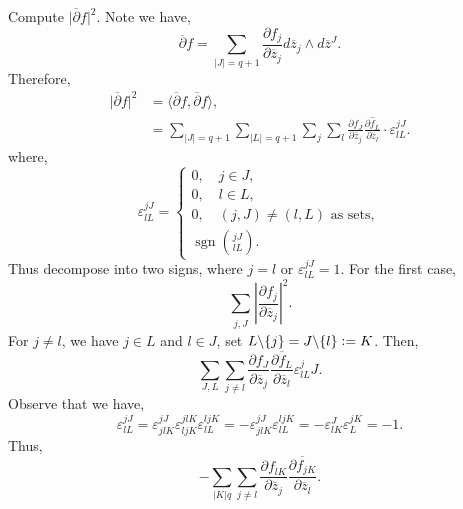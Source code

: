 \documentclass{article}
\DeclareMathOperator{\sgn}{sgn}
\newcommand{\defeq}{\vcentcolon=}
\newcommand{\pd}[2]{{\frac {\partial#1} {\partial#2}}}
\begin{document}
Compute $\vert \overline{\partial}f\vert^2$. Note we have,
\begin{equation*}
  \overline{\partial}f=\sum_{\vert J\vert = q+1}\pd{f_j}{\overline{z}_j}d\overline{z}_j\wedge d\overline{z}^J.
\end{equation*}
Therefore,
\begin{align*}
  \vert\overline{\partial}f\vert^2 & = \langle\overline{\partial}f,\overline{\partial}f\rangle,\\
  & = \sum_{\vert J\vert = q+1}\sum_{\vert L\vert =q+1}\sum_j\sum_l\pd{f_J}{\overline{z}_j}\overline{\pd{f_L}{\overline{z}_l}}\cdot\varepsilon^{jJ}_{lL}.
\end{align*}
where,
\begin{equation*}
  \varepsilon_{lL}^{jJ}=\begin{cases}
    0,\quad j\in J,\\
    0,\quad l\in L,\\
    0,\quad (j,J)\not=(l,L)\text{ as sets},\\
    \sgn{jJ\choose lL}.
  \end{cases}
\end{equation*}
Thus decompose into two signs, where $j=l$ or $\varepsilon_{lL}^{jJ}=1$. 
For the first case,
\begin{equation*}
  \sum_{\substack{j,J}} \left\vert\pd{f_j}{\overline{z}_j}\right\vert^2. 
\end{equation*}
For $j\not=l$, we have $j\in L$ and $l\in J$, set $L\backslash\{j\}=J\backslash\{l\}\defeq K$. Then,
\begin{equation*}
  \sum_{J,L}\sum_{j\not=l}\pd{f_{J}}{\overline{z}_j}\overline{\pd{f_{L}}{\overline{z}_l}}\varepsilon_{lL}^jJ.
\end{equation*}
Observe that we have,
\begin{equation*}
  \varepsilon_{lL}^{jJ}=\varepsilon_{jlK}^{jJ}\varepsilon_{ljK}^{jlK}\varepsilon_{lL}^{ljK} = -\varepsilon_{jlK}^{jJ}\varepsilon_{lL}^{ljK}=-\varepsilon_{lK}^J\varepsilon_L^{jK}=-1.
\end{equation*}
Thus,
\begin{equation*}
  -\sum_{\vert K\vert q}\sum_{j\not=l}\pd{f_{lK}}{\overline{z}_j}\overline{\pd{f_{jK}}{\overline{z}_l}}.
\end{equation*}
\end{document}
